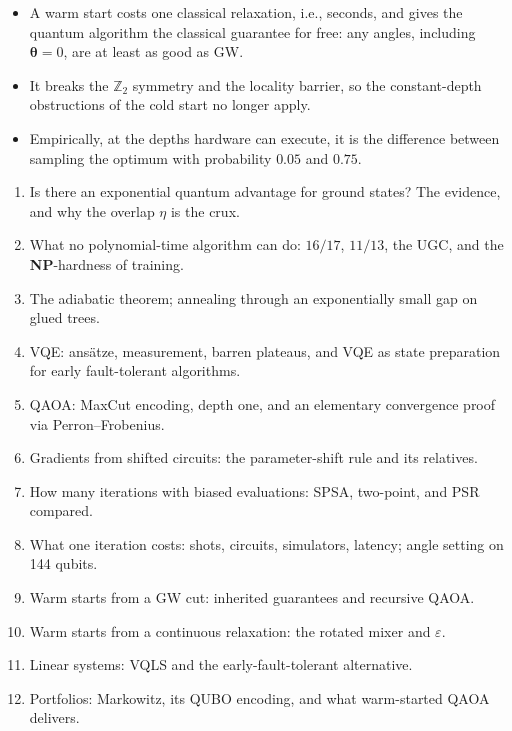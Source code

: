\documentclass[handoutsbeamer.tex]{subfiles}
\begin{document}
\begin{frame}
\begin{itemize}\setlength\itemsep{0.4em}
    \item A warm start costs one classical relaxation, i.e., seconds, and gives the quantum algorithm the classical guarantee for free: any angles, including $\boldsymbol\theta = 0$, are at least as good as GW.
    \item It breaks the $\mathbb{Z}_2$ symmetry and the locality barrier, so the constant-depth obstructions of the cold start no longer apply.
    \item Empirically, at the depths hardware can execute, it is the difference between sampling the optimum with probability $0.05$ and $0.75$.
\end{itemize}
\end{frame}

\begin{frame}
\onp{\footnotesize}
\begin{enumerate}\setlength\itemsep{0.05em}\setcounter{enumi}{1}
    \item Is there an exponential quantum advantage for ground states? The evidence, and why the overlap $\eta$ is the crux.
    \item What no polynomial-time algorithm can do: $16/17$, $11/13$, the UGC, and the \textbf{NP}-hardness of training.
    \item The adiabatic theorem; annealing through an exponentially small gap on glued trees.
    \item VQE: ansätze, measurement, barren plateaus, and VQE as state preparation for early fault-tolerant algorithms.
    \item QAOA: MaxCut encoding, depth one, and an elementary convergence proof via Perron--Frobenius.
    \item Gradients from shifted circuits: the parameter-shift rule and its relatives.
    \item How many iterations with biased evaluations: SPSA, two-point, and PSR compared.
    \item What one iteration costs: shots, circuits, simulators, latency; angle setting on 144 qubits.
    \item Warm starts from a GW cut: inherited guarantees and recursive QAOA.
    \item Warm starts from a continuous relaxation: the rotated mixer and $\varepsilon$.
    \item Linear systems: VQLS and the early-fault-tolerant alternative.
    \item Portfolios: Markowitz, its QUBO encoding, and what warm-started QAOA delivers.
\end{enumerate}
\end{frame}

\begin{frame}[allowframebreaks]
\biblio
\end{frame}
\end{document}
